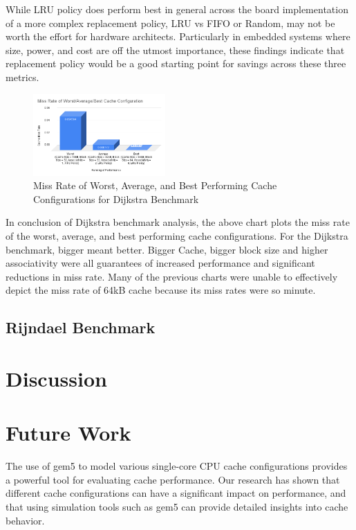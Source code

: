 \documentclass[conference]{IEEEtran}
\begin{document}
While LRU policy does perform best in general across the board implementation of a more complex replacement policy, LRU vs FIFO or Random, may not be worth the effort for hardware architects. Particularly in embedded systems where size, power, and cost are off the utmost importance, these findings indicate that replacement policy would be a good starting point for savings across these three metrics.

\begin{figure}[H]
  \centering
  \includegraphics[width=0.45\textwidth]{dijkstraFigures/MissRateofWorstAverageBestCacheConfiguration.png}
  \caption{Miss Rate of Worst, Average, and Best Performing Cache Configurations for Dijkstra Benchmark}
  \label{fig:EmpC1-Training}
\end{figure}

In conclusion of Dijkstra benchmark analysis, the above chart plots the miss rate of the worst, average, and best performing cache configurations. For the Dijkstra benchmark, bigger meant better. Bigger Cache, bigger block size and higher associativity were all guarantees of increased performance and significant reductions in miss rate. Many of the previous charts were unable to effectively depict the miss rate of 64kB cache because its miss rates were so minute.

\subsection{Rijndael Benchmark}



\section{Discussion}


\section{Future Work}
The use of gem5 to model various single-core CPU cache configurations provides a powerful tool for evaluating cache performance. Our research has shown that different cache configurations can have a significant impact on performance, and that using simulation tools such as gem5 can provide detailed insights into cache behavior.
\end{document}
